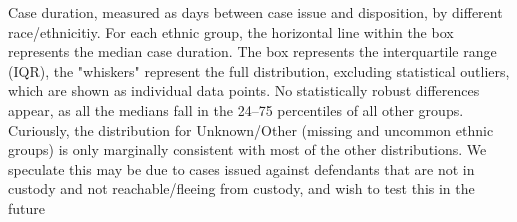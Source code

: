 Case duration, measured as days between case issue and disposition, by different race/ethnicitiy. For each ethnic group, the horizontal line within the box represents the median case duration. The box represents the interquartile range (IQR), the "whiskers" represent the full distribution, excluding statistical outliers, which are shown as individual data points. No statistically robust differences appear, as all the medians fall in the 24--75 percentiles of all other groups. Curiously, the distribution for Unknown/Other (missing and uncommon ethnic groups) is only marginally consistent with most of the other distributions. We speculate this may be due to cases issued against defendants that are not in custody and not reachable/fleeing from custody, and wish to test this in the future

\label{fig:DurationsEthnicity}